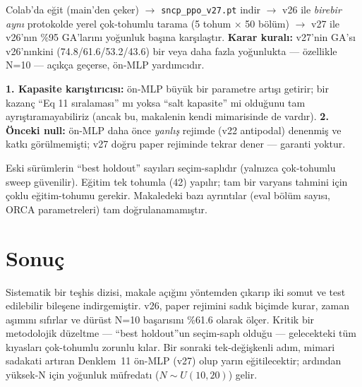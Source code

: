 \documentclass[11pt,a4paper]{article}
\begin{document}
\begin{yontem}
Colab'da eğit (main'den çeker) $\rightarrow$ \texttt{sncp\_ppo\_v27.pt} indir $\rightarrow$ v26 ile
\emph{birebir aynı} protokolde yerel çok-tohumlu tarama (5 tohum $\times$ 50 bölüm) $\rightarrow$ v27
ile v26'nın \%95 GA'larını yoğunluk başına karşılaştır. \textbf{Karar kuralı:} v27'nin GA'sı v26'nınkini
(74.8/61.6/53.2/43.6) bir veya daha fazla yoğunlukta — özellikle N=10 — açıkça geçerse, ön-MLP yardımcıdır.
\end{yontem}

\begin{uyari}
\textbf{1. Kapasite karıştırıcısı:} ön-MLP büyük bir parametre artışı getirir; bir kazanç ``Eq 11 sıralaması''
mı yoksa ``salt kapasite'' mi olduğunu tam ayrıştıramayabiliriz (ancak bu, makalenin kendi mimarisinde de
vardır). \textbf{2. Önceki null:} ön-MLP daha önce \emph{yanlış} rejimde (v22 antipodal) denenmiş ve katkı
görülmemişti; v27 doğru paper rejiminde tekrar dener — garanti yoktur.
\end{uyari}

\begin{uyari}
Eski sürümlerin ``best holdout'' sayıları seçim-saplıdır (yalnızca çok-tohumlu sweep güvenilir). Eğitim
tek tohumla (42) yapılır; tam bir varyans tahmini için çoklu eğitim-tohumu gerekir. Makaledeki bazı
ayrıntılar (eval bölüm sayısı, ORCA parametreleri) tam doğrulanamamıştır.
\end{uyari}

\section{Sonuç}

Sistematik bir teşhis dizisi, makale açığını yöntemden çıkarıp iki somut ve test edilebilir bileşene
indirgemiştir. v26, paper rejimini sadık biçimde kurar, zaman aşımını sıfırlar ve dürüst N=10 başarısını
\%61.6 olarak ölçer. Kritik bir metodolojik düzeltme — ``best holdout''un seçim-saplı olduğu — gelecekteki
tüm kıyasları çok-tohumlu zorunlu kılar. Bir sonraki tek-değişkenli adım, mimari sadakati artıran Denklem~11
ön-MLP (v27) olup yarın eğitilecektir; ardından yüksek-N için yoğunluk müfredatı ($N\sim U(10,20)$) gelir.
\end{document}
